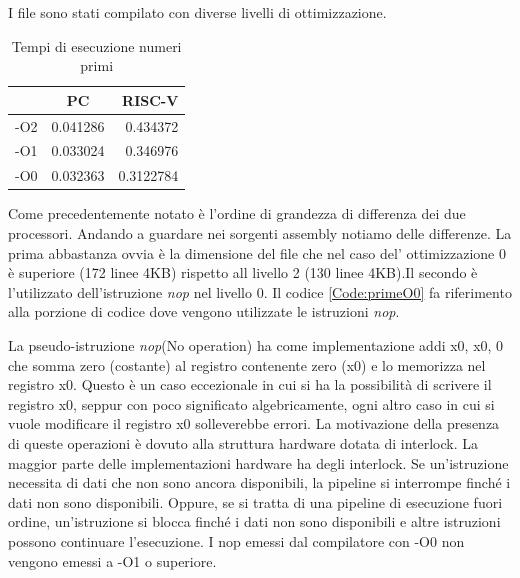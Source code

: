 \documentclass[12pt,a4paper]{report}
\begin{document}


I file sono stati compilato con diverse livelli di ottimizzazione.
\begin{table}[ht]
\begin{tabular}{|l|c|r|}
\hline
    & PC       & RISC-V    \\ \hline
-O2 & 0.041286 & 0.434372  \\ \hline
-O1 & 0.033024 & 0.346976  \\ \hline
-O0 & 0.032363 & 0.3122784 \\ \hline
\end{tabular}
\caption{Tempi di esecuzione numeri primi}
\label{Tab:TempoPrime}
\end{table}
Come precedentemente notato è l'ordine di grandezza di differenza dei due processori. Andando a guardare nei sorgenti assembly notiamo delle differenze. La prima abbastanza ovvia è la dimensione del file che nel caso del' ottimizzazione 0 è superiore (172 linee 4KB) rispetto all livello 2 (130 linee 4KB).Il secondo è l'utilizzato dell'istruzione \textit{nop} nel livello 0.
Il codice \ref{Code:primeO0} fa riferimento alla porzione di codice dove vengono utilizzate le istruzioni \textit{nop}.



La pseudo-istruzione \textit{nop}(No operation) ha come implementazione addi x0, x0, 0 che somma zero (costante) al registro contenente zero (x0) e lo memorizza nel registro x0.  Questo è un caso eccezionale in cui si ha la possibilità di scrivere il registro x0, seppur con poco significato algebricamente, ogni altro caso in cui si vuole modificare il registro x0 solleverebbe errori. La motivazione della presenza di queste operazioni è dovuto alla struttura hardware dotata di interlock. %
La maggior parte delle implementazioni hardware ha degli interlock. Se un'istruzione necessita di dati che non sono ancora disponibili, la pipeline si interrompe finché i dati non sono disponibili. Oppure, se si tratta di una pipeline di esecuzione fuori ordine, un'istruzione si blocca finché i dati non sono disponibili e altre istruzioni possono continuare l'esecuzione.
I nop emessi dal compilatore con -O0  non vengono emessi a -O1 o superiore. 
\end{document}
